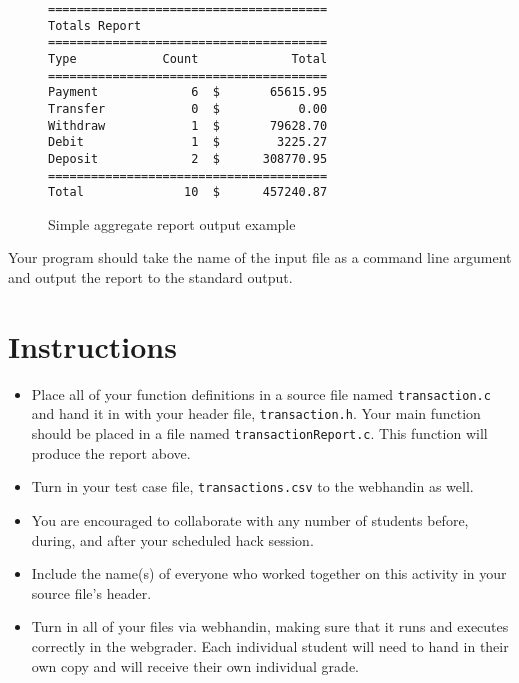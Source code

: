 \documentclass[12pt]{scrartcl}
\begin{document}
\begin{figure}[ht]
\begin{verbatim}
=======================================
Totals Report
=======================================
Type            Count             Total
=======================================
Payment             6  $       65615.95
Transfer            0  $           0.00
Withdraw            1  $       79628.70
Debit               1  $        3225.27
Deposit             2  $      308770.95
=======================================
Total              10  $      457240.87
\end{verbatim}
\caption{Simple aggregate report output example}
\label{figure:simpleReport}
\end{figure}

Your program should take the name of the input file as a command line argument
and output the report to the standard output.


\section*{Instructions}

\begin{itemize}

  \item Place all of your function definitions in a source file named 
  \texttt{transaction.c} and hand it in with your header file, 
  \texttt{transaction.h}.  Your main function should be
  placed in a file named \texttt{transactionReport.c}.  This
  function will produce the report above.

  \item Turn in your test case file, \texttt{transactions.csv}
  to the webhandin as well.

  \item You are encouraged to collaborate with any number of students 
  before, during, and after your scheduled hack session.  

  \item Include the name(s) of everyone who worked together on
  this activity in your source file's header.

  \item Turn in all of your files via webhandin, making sure that 
  it runs and executes correctly in the webgrader.  Each individual 
  student will need to hand in their own copy and will receive 
  their own individual grade.
\end{itemize}  
\end{document}
